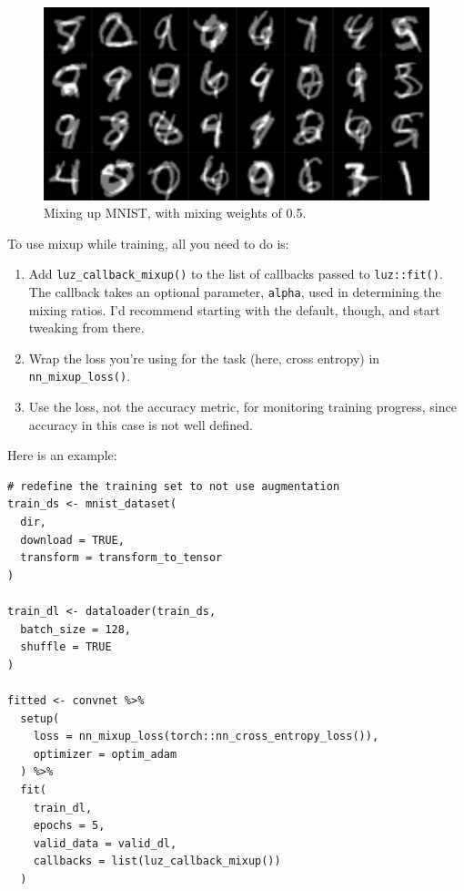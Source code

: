 \documentclass[
  letterpaper,
]{krantz}
\begin{document}
\begin{figure}[H]

{\centering \includegraphics{images/overfitting-mnist-mixup-0.5.png}

}

\caption{\label{fig-overfitting-mnist-mixup-0.5}Mixing up MNIST, with
mixing weights of 0.5.}

\end{figure}

To use mixup while training, all you need to do is:

\begin{enumerate}
\def\labelenumi{\arabic{enumi}.}
\item
  Add
  \texttt{luz\_callback\_mixup()}
  to the list of callbacks passed to \texttt{luz::fit()}. The callback
  takes an optional parameter, \texttt{alpha}, used in determining the
  mixing ratios. I'd recommend starting with the default, though, and
  start tweaking from there.
\item
  Wrap the loss you're using for the task (here, cross entropy) in
  \texttt{nn\_mixup\_loss()}.
\item
  Use the loss, not the accuracy metric, for monitoring training
  progress, since accuracy in this case is not well defined.
\end{enumerate}

Here is an example:

\begin{verbatim}
# redefine the training set to not use augmentation
train_ds <- mnist_dataset(
  dir,
  download = TRUE,
  transform = transform_to_tensor
)

train_dl <- dataloader(train_ds,
  batch_size = 128,
  shuffle = TRUE
)

fitted <- convnet %>%
  setup(
    loss = nn_mixup_loss(torch::nn_cross_entropy_loss()),
    optimizer = optim_adam
  ) %>%
  fit(
    train_dl,
    epochs = 5,
    valid_data = valid_dl,
    callbacks = list(luz_callback_mixup())
  )
\end{verbatim}
\end{document}
